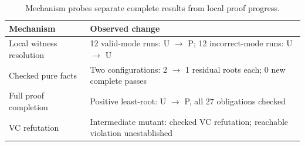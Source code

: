 \begin{table}[t]
\centering\small
\caption{Mechanism probes separate complete results from local proof progress.}
\label{tab:mechanisms}
\begin{tabular}{p{}p{}}
\toprule
Mechanism & Observed change \\
\midrule
Local witness resolution & 12 valid-mode runs: U $\to$ P; 12 incorrect-mode runs: U $\to$ U \\
Checked pure facts & Two configurations: 2 $\to$ 1 residual roots each; 0 new complete passes \\
Full proof completion & Positive least-root: U $\to$ P, all 27 obligations checked \\
VC refutation & Intermediate mutant: checked VC refutation; reachable violation unestablished \\
\bottomrule
\end{tabular}
\end{table}
